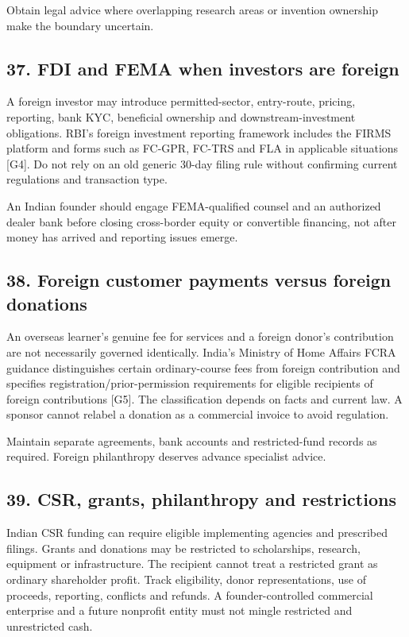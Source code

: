Obtain legal advice where overlapping research areas or invention ownership make the boundary uncertain.

\subsection{37. FDI and FEMA when investors are foreign}

A foreign investor may introduce permitted-sector, entry-route, pricing, reporting, bank KYC, beneficial ownership and downstream-investment obligations. RBI's foreign investment reporting framework includes the FIRMS platform and forms such as FC-GPR, FC-TRS and FLA in applicable situations [G4]. Do not rely on an old generic 30-day filing rule without confirming current regulations and transaction type.

An Indian founder should engage FEMA-qualified counsel and an authorized dealer bank before closing cross-border equity or convertible financing, not after money has arrived and reporting issues emerge.

\subsection{38. Foreign customer payments versus foreign donations}

An overseas learner's genuine fee for services and a foreign donor's contribution are not necessarily governed identically. India's Ministry of Home Affairs FCRA guidance distinguishes certain ordinary-course fees from foreign contribution and specifies registration/prior-permission requirements for eligible recipients of foreign contributions [G5]. The classification depends on facts and current law. A sponsor cannot relabel a donation as a commercial invoice to avoid regulation.

Maintain separate agreements, bank accounts and restricted-fund records as required. Foreign philanthropy deserves advance specialist advice.

\subsection{39. CSR, grants, philanthropy and restrictions}

Indian CSR funding can require eligible implementing agencies and prescribed filings. Grants and donations may be restricted to scholarships, research, equipment or infrastructure. The recipient cannot treat a restricted grant as ordinary shareholder profit. Track eligibility, donor representations, use of proceeds, reporting, conflicts and refunds. A founder-controlled commercial enterprise and a future nonprofit entity must not mingle restricted and unrestricted cash.

